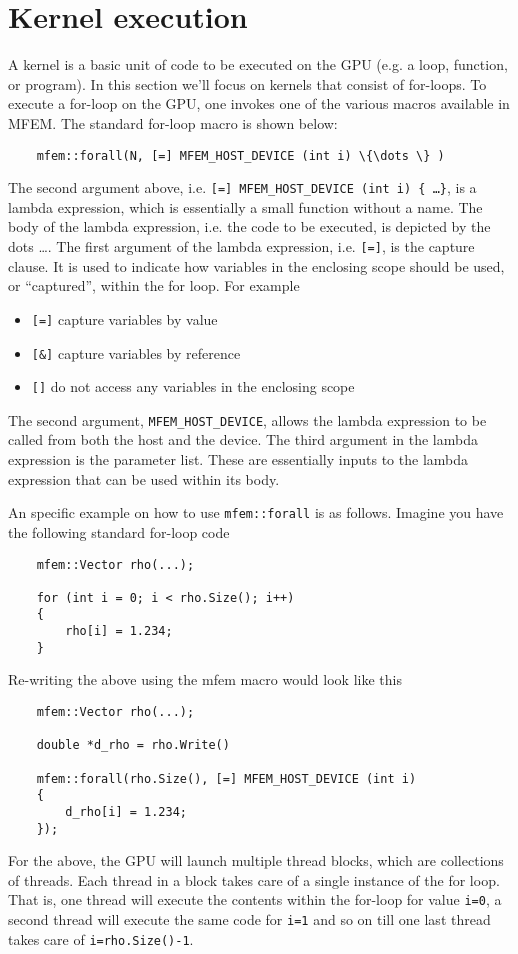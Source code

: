 \documentclass[a4paper,11pt]{article}
\begin{document}
\section{Kernel execution}
\label{sec:for_loops}
A kernel is a basic unit of code to be executed on the GPU (e.g. a loop, function, or program). In this section we'll focus on kernels that consist of for-loops. To execute a for-loop on the GPU, one invokes one of the various macros available in MFEM. The standard for-loop macro is shown below:
\begin{lstlisting}
    mfem::forall(N, [=] MFEM_HOST_DEVICE (int i) \{\dots \} )
\end{lstlisting}
The second argument above, i.e. \texttt{[=] MFEM\_HOST\_DEVICE (int i) \{ \dots \}}, is a lambda expression, which is essentially a small function without a name. The body of the lambda expression, i.e. the code to be executed, is depicted by the dots \dots. The first argument of the lambda expression, i.e. \texttt{[=]}, is the capture clause. It is used to indicate how variables in the enclosing scope should be used, or ``captured'', within the for loop. For example
\begin{itemize}
    \item \texttt{[=]} capture variables by value
    \item \texttt{[\&]} capture variables by reference
    \item \texttt{[]} do not access any variables in the enclosing scope
\end{itemize}
The second argument, \texttt{MFEM\_HOST\_DEVICE}, allows the lambda expression to be called from both the host and the device. The third argument in the lambda expression is the parameter list. These are essentially inputs to the lambda expression that can be used within its body. 

An specific example on how to use \texttt{mfem::forall} is as follows. Imagine you have the following standard for-loop code
\begin{lstlisting}
    mfem::Vector rho(...);

    for (int i = 0; i < rho.Size(); i++)
    {
        rho[i] = 1.234;
    }
\end{lstlisting}
Re-writing the above using the mfem macro would look like this
\begin{lstlisting}
    mfem::Vector rho(...);

    double *d_rho = rho.Write()

    mfem::forall(rho.Size(), [=] MFEM_HOST_DEVICE (int i)
    {
        d_rho[i] = 1.234;
    });
\end{lstlisting}
For the above, the GPU will launch multiple thread blocks, which are collections of threads. Each thread in a block takes care of a single instance of the for loop. That is, one thread will execute the contents within the for-loop for value \texttt{i=0}, a second thread will execute the same code for \texttt{i=1} and so on till one last thread takes care of \texttt{i=rho.Size()-1}.
\end{document}
